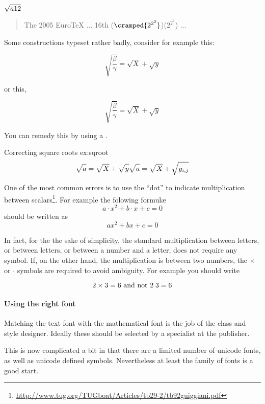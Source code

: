 {{{{$\sqrtsign{a12}$

\meaning\sqrtsign


\begin{quote}
The 2005 Euro\TeX{} ... 16th ($\cramped{2^{2^2}}$)($2^{2^2}$) ...
\end{quote}

Some \tex constructions typeset rather badly, consider for example this:

\[
\sqrt{\frac{\beta}{\gamma}} = \sqrt{X} + \sqrt{y}
\]

\noindent or this,

\[
\surd{\frac{\beta}{\gamma}} = \surd{X} + \surd{y}
\]


You can remedy this by using a .


\begin{texexample} {Correcting square roots} {ex:sqroot}
\[
\sqrt{\mathstrut a}=\sqrt{\mathstrut X}+\sqrt{\mathstrut y}
\sqrt{\mathstrut a}=\sqrt{\mathstrut X}+\sqrt{\mathstrut y_{i,j}}
\]
\end{texexample}




One of the most common errors is to use the ``dot'' to indicate multiplication between scalars\footnote{\url{http://www.tug.org/TUGboat/Articles/tb29-2/tb92guiggiani.pdf}}. For example the folowing formul\ae
\[a\cdot x^2+b\cdot x+c=0\]
should be written as
\[ax^2+bx+c=0\]

In fact, for the the sake of simplicity, the standard multiplication between letters, or between letters, or between a number and a letter, does not require any symbol. If, on the other hand, the multiplication is between two numbers, the $\times$ or $\cdot$ symbols are required to avoid ambiguity.
For example you should write

\[2\times 3=6 \text{ and not } 2\thickspace 3=6 \]


\paragraph{Using the right font}

Matching the text font with the mathematical font is the job of the class and
style designer. Ideally these should be selected by a specialist at the publisher.

This is now complicated a bit in that there are a limited number of unicode fonts, as well as unicode defined symbols. Nevertheless at least the  family of fonts is a good start.

}}}}
